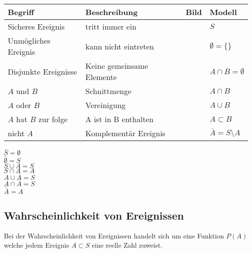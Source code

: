 \begin{minipage}[t]{0.85\textwidth}
	\begin{tabular}[t]{|m{3.4cm}|m{4.5cm}|m{2.5cm}|m{1.8cm}|}
		\hline
		Begriff & Beschreibung & Bild & Modell\\
		\hline
		Sicheres Ereignis & tritt immer ein &  & $S$\\
		\hline
		Unmögliches Ereignis & kann nicht eintreten &  & $\emptyset = \{\}$\\
		\hline
		Disjunkte Ereignisse & Keine gemeinsame Elemente &  & $A \cap B = \emptyset$\\
		\hline
		$A$ und $B$ & Schnittmenge &  & $A \cap B$\\
		\hline
		$A$ oder $B$ & Vereinigung &  & $A \cup B$\\
		\hline
		$A$ hat $B$ zur folge & A ist in B enthalten &  & $A \subset B$ \\
		\hline
		nicht $A$ & Komplementär Ereignis &  & $\bar{A} = S\setminus A$\\
		\hline
	\end{tabular}
\end{minipage} %
\begin{minipage}[t]{0.15\textwidth}
	\vspace{10pt}
	$\bar{S} = \emptyset$\\
	$\bar{\emptyset} = S$\\
	$S \cup A = S$\\
	$S \cap A = A$\\
	$A \cup \bar{A} = S$\\
	$A \cap \bar{A} = S$\\
	$\bar{\bar{A}} = A$\\
\end{minipage}

\subsection{Wahrscheinlichkeit von Ereignissen}
\begin{minipage}{0.7\textwidth}
	Bei der Wahrscheinlichkeit von Ereignissen handelt sich um eine Funktion $P(A)$ welche jedem Ereignis $A \subset S$ eine reelle Zahl zuweist.
\end{minipage}
\begin{minipage}{0.3\textwidth}
	\begin{center}
	\end{center}
\end{minipage}

